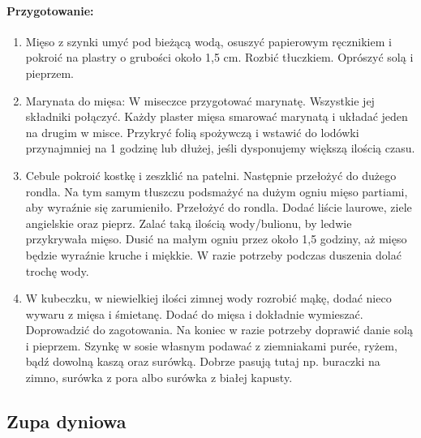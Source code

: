 \documentclass{article}
\begin{document}
    \paragraph{Przygotowanie:}
    \begin{enumerate}
        \item Mięso z szynki umyć pod bieżącą wodą, osuszyć papierowym
            ręcznikiem i pokroić na plastry o grubości około 1,5 cm. Rozbić
            tłuczkiem. Oprószyć solą i pieprzem.
        \item Marynata do mięsa: W miseczce przygotować marynatę. Wszystkie jej
            składniki połączyć. Każdy plaster mięsa smarować marynatą i układać
            jeden na drugim w misce. Przykryć folią spożywczą i wstawić do
            lodówki przynajmniej na 1 godzinę lub dłużej, jeśli dysponujemy
            większą ilością czasu.
        \item Cebule pokroić kostkę i zeszklić na patelni. Następnie przełożyć
            do dużego rondla. Na tym samym tłuszczu podsmażyć na dużym ogniu
            mięso partiami, aby wyraźnie się zarumieniło. Przełożyć do rondla.
            Dodać liście laurowe, ziele angielskie oraz pieprz. Zalać taką
            ilością wody/bulionu, by ledwie przykrywała mięso. Dusić na małym
            ogniu przez około 1,5 godziny, aż mięso będzie wyraźnie kruche i
            miękkie. W razie potrzeby podczas duszenia dolać trochę wody.
        \item W kubeczku, w niewielkiej ilości zimnej wody rozrobić mąkę, dodać
            nieco wywaru z mięsa i śmietanę. Dodać do mięsa i dokładnie
            wymieszać.  Doprowadzić do zagotowania. Na koniec w razie potrzeby
            doprawić danie solą i pieprzem. Szynkę w sosie własnym podawać z
            ziemniakami purée, ryżem, bądź dowolną kaszą oraz surówką. Dobrze
            pasują tutaj np. buraczki na zimno, surówka z pora albo surówka z
            białej kapusty.
    \end{enumerate}
    \newpage


    \subsection{Zupa dyniowa}
    \bigskip
\end{document}

